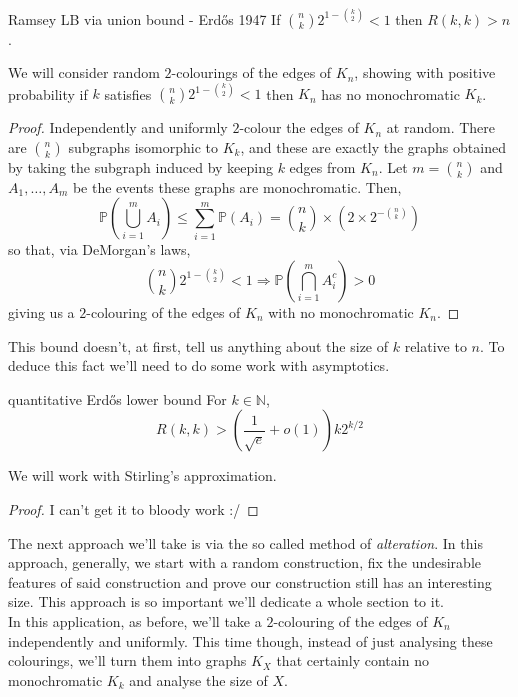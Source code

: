 \documentclass{article}
\begin{document}
\begin{proposition}[]{Ramsey LB via union bound - Erd\H{o}s 1947}
    If $\binom{n}{k}2^{1 - \binom{k}{2}} < 1$ then $R(k, k) > n$. 
\end{proposition}

We will consider random $2$-colourings of the edges of $K_n$, showing with positive probability if 
$k$ satisfies $\binom{n}{k}2^{1 - \binom{k}{2}} < 1$ then $K_n$ has no monochromatic $K_k$. 

\begin{proof}
    Independently and uniformly $2$-colour the edges of $K_n$ at random. There are $\binom{n}{k}$ 
    subgraphs isomorphic to $K_k$, and these are exactly the graphs obtained by taking the subgraph induced by 
    keeping $k$ edges from $K_n$. Let $m = \binom{n}{k}$ and $A_1, \dots, A_{m}$ be the events these graphs are monochromatic. 
    Then, 
    \[\mathbb{P}\left(\bigcup_{i = 1}^{m}A_i\right) \leq \sum_{i = 1}^{m}\mathbb{P}(A_i) = 
    \binom{n}{k} \times (2 \times 2^{- \binom{n}{k}})\]
    so that, via DeMorgan's laws,
    \[\binom{n}{k}2^{1 - \binom{k}{2}} < 1 \Longrightarrow \mathbb{P}\left(\bigcap_{i = 1}^{m}A_i^c\right) > 0\]
    giving us a $2$-colouring of the edges of $K_n$ with no monochromatic $K_n$. 
\end{proof}

This bound doesn't, at first, tell us anything about the size of $k$ relative to $n$. To deduce this fact we'll 
need to do some work with asymptotics.

\begin{proposition}[]{quantitative Erd\H{o}s lower bound}
    For $k \in \mathbb{N}$, 
    \[R(k, k) > \left(\frac{1}{\sqrt{e}} + o(1)\right)k2^{k/2}\]
\end{proposition}

We will work with Stirling's approximation.

\begin{proof}
    I can't get it to bloody work :/
\end{proof}

The next approach we'll take is via the so called method of {\it alteration}. In this approach, generally,
we start with a random construction, fix the undesirable features of said construction and prove our construction 
still has an interesting size. This approach is so important we'll dedicate a whole section to it. \\ 

In this application, as before, we'll take a $2$-colouring of the edges of $K_n$ independently and uniformly. This 
time though, instead of just analysing these colourings, we'll turn them into graphs $K_X$ that certainly contain no 
monochromatic $K_k$ and analyse the size of $X$. 
\end{document}
